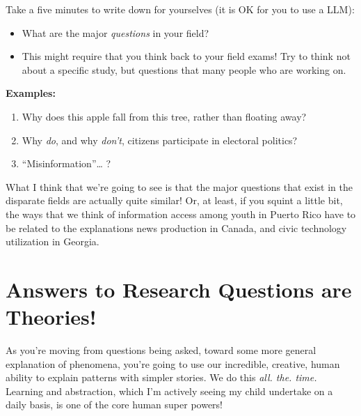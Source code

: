 \documentclass[
  letterpaper,
  DIV=11,
  numbers=noendperiod]{scrreprt}
\providecommand{\tightlist}{%
  \setlength{\itemsep}{0pt}\setlength{\parskip}{0pt}}\usepackage{longtable,booktabs,array}
\begin{document}
\begin{tcolorbox}[enhanced jigsaw, titlerule=0mm, colback=white, toptitle=1mm, toprule=.15mm, bottomtitle=1mm, colframe=quarto-callout-note-color-frame, colbacktitle=quarto-callout-note-color!10!white, bottomrule=.15mm, leftrule=.75mm, opacityback=0, title=\textcolor{quarto-callout-note-color}{\faInfo}\hspace{0.5em}{1. Research Questions}, opacitybacktitle=0.6, arc=.35mm, rightrule=.15mm, breakable, coltitle=black, left=2mm]

Take a five minutes to write down for yourselves (it is OK for you to
use a LLM):

\begin{itemize}
\tightlist
\item
  What are the major \emph{questions} in your field?
\item
  This might require that you think back to your field exams! Try to
  think not about a specific study, but questions that many people who
  are working on.
\end{itemize}

\textbf{Examples:}

\begin{enumerate}
\def\labelenumi{\arabic{enumi}.}
\tightlist
\item
  Why does this apple fall from this tree, rather than floating away?
\item
  Why \emph{do}, and why \emph{don't}, citizens participate in electoral
  politics?
\item
  ``Misinformation''\ldots{} ?
\end{enumerate}

\end{tcolorbox}

What I think that we're going to see is that the major questions that
exist in the disparate fields are actually quite similar! Or, at least,
if you squint a little bit, the ways that we think of information access
among youth in Puerto Rico have to be related to the explanations news
production in Canada, and civic technology utilization in Georgia.


\chapter{Answers to Research Questions are
Theories!}\label{answers-to-research-questions-are-theories}

As you're moving from questions being asked, toward some more general
explanation of phenomena, you're going to use our incredible, creative,
human ability to explain patterns with simpler stories. We do this
\emph{all. the. time.} Learning and abstraction, which I'm actively
seeing my child undertake on a daily basis, is one of the core human
super powers!
\end{document}
